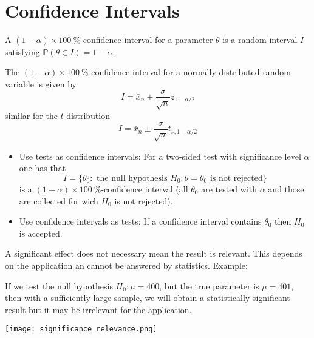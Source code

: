 \section{Confidence Intervals}
A $(1-\alpha)\times 100\:\%$-confidence interval for a parameter $\theta$ is a random interval $I$ satisfying $\mathbb{P}(\theta\in I)=1-\alpha$.

The $(1-\alpha)\times 100\:\%$-confidence interval for a normally distributed random variable is given by
\begin{equation*}
    I=\bar{x}_n \pm \frac{\sigma}{\sqrt{n}}z_{1-\alpha/2}
\end{equation*}
similar for the $t$-distribution
\begin{equation*}
    I=\bar{x}_n \pm \frac{\sigma}{\sqrt{n}}t_{\nu,1-\alpha/2}
\end{equation*}

\newpar{}

\begin{itemize}
    \item Use tests as confidence intervals: For a two-sided test with significance level $\alpha$ one has that
    \begin{equation*}
        I=\{\theta_0:\text{ the null hypothesis }H_0\colon\theta=\theta_0\text{ is not rejected}\}
    \end{equation*}
    is a $(1-\alpha)\times 100\:\%$-confidence interval (all $\theta_0$ are tested with $\alpha$ and those are collected for wich $H_0$ is not rejected).
    \item Use confidence intervals as tests: If a confidence interval contains $\theta_0$ then $H_0$ is accepted.
\end{itemize}

\newpar{}

A significant effect does not necessary mean the result is relevant. This depends on the application an cannot be answered by statistics.
\newpar{}
Example:

If we test the null hypothesis $H_0:\mu=400$, but the true parameter is $\mu=401$, then with a sufficiently large sample, we will obtain a statistically significant result but it may be irrelevant for the application.

\begin{center}
    \texttt{[image: significance\_relevance.png]}
\end{center}


